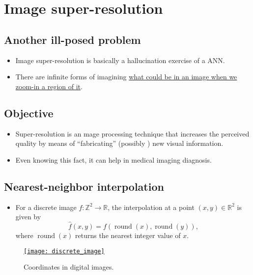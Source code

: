 \chapter{Image super-resolution}

\section{Another ill-posed problem}
\begin{itemize}
\item Image super-resolution is basically a hallucination exercise of
  a \gls{ANN}.
\item There are infinite forms of imagining
  \href{https://en.wikipedia.org/wiki/Super-resolution_imaging}{what
    could be in an image when we zoom-in a region of it}.
\end{itemize}

\section{Objective}
\begin{itemize}
\item Super-resolution is an mage processing technique that
  increases the perceived quality by means of ``fabricating''
  (possibly ) new visual information.
\item Even knowing this fact, it can help in medical imaging
  diagnosis.
\end{itemize}

\section{Nearest-neighbor interpolation \cite{gonzalez2009digital}}
\begin{itemize}
\item For a discrete image $f: \mathbb{Z}^2 \to \mathbb{R}$, the interpolation at a point 
$(x,y) \in \mathbb{R}^2$ is given by
\begin{equation}
\hat{f}(x,y) = f\!\left( \operatorname{round}(x), \operatorname{round}(y) \right),
\end{equation}
where $\operatorname{round}(x)$ returns the nearest integer value of $x$.
\end{itemize}

\begin{figure}[H]
  \vspace{-2ex}
  \centering
  \href{https://www.mrecacademics.com/DepartmentStudyMaterials/20201220-Digital%20Image%20Processing%20Notes.pdf}{\texttt{[image: discrete\_image]}}
  \caption{Coordinates in digital images.}
  \label{fig:digital_image}
\end{figure}

